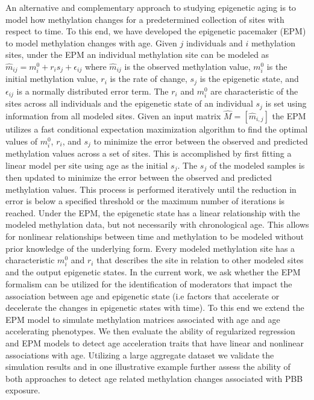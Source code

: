 \documentclass{article}
\begin{document}
{\begin{linenumbers}
An alternative and complementary approach to studying epigenetic aging is to model how methylation changes for a 
predetermined collection of sites with respect to time. To this end, we have developed the epigenetic pacemaker 
(EPM) \cite{Snir2016-dv,Farrell2020-ri} to model methylation changes with age. Given $j$ individuals and $i$ 
methylation sites, under the EPM an individual methylation site can be modeled as 
$\hat{m}_{ij} = m^0_i + r_is_j + \epsilon _{ij}$ where $\hat{m}_{ij}$ is the observed methylation value, 
$m^0_i$ is the initial methylation value, $r_i$ is the rate of change, $s_j$ is the epigenetic state, and 
$\epsilon _{ij}$ is a normally distributed error term. The $r_i$ and $m^0_i$ are characteristic of the sites 
across all individuals and the epigenetic state of an individual $s_j$ is set using information from all modeled 
sites. Given an input matrix $\hat M=[\hat  m_{i,j}]$ the EPM utilizes a fast conditional expectation maximization 
algorithm to find the optimal values of $m^0_i$, $r_i$, and $s_j$ to minimize the error between the observed 
and predicted methylation values across a set of sites. This is accomplished by first fitting a linear model 
per site using age as the initial $s_j$. The $s_j$ of the modeled samples is then updated to minimize the error 
between the observed and predicted methylation values. This process is performed iteratively until the reduction 
in error is below a specified threshold or the maximum number of iterations is reached. Under the EPM, the epigenetic 
state has a linear relationship with the modeled methylation data, but not necessarily with chronological age. This 
allows for nonlinear relationships between time and methylation to be modeled without prior knowledge of the underlying 
form. Every modeled methylation site has a characteristic $m^0_i$ and $r_i$ that describes the site in relation to 
other modeled sites and the output epigenetic states. In the current work, we ask whether the EPM formalism can be 
utilized for the identification of moderators that impact the association between age and epigenetic state 
(i.e factors that accelerate or decelerate the changes in epigenetic states with time).  To this end we extend the 
EPM model to simulate methylation matrices associated with age and age accelerating phenotypes. We then evaluate the 
ability of regularized regression and EPM models to detect age acceleration traits that have linear and nonlinear 
associations with age.  Utilizing a large aggregate dataset we validate the simulation results and in one 
illustrative example further assess the ability of both approaches to detect age related methylation 
changes associated with PBB exposure.


\end{linenumbers}}
\end{document}
